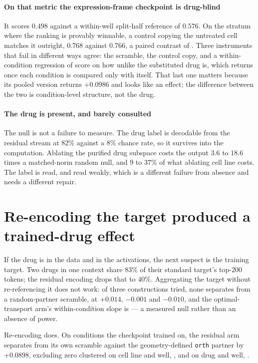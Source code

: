 \paragraph{On that metric the expression-frame checkpoint is drug-blind} It
scores $0.498$ against a within-well split-half reference of $0.576$. On the
stratum where the ranking is provably winnable, a control copying the untreated
cell matches it outright, $0.768$ against $0.766$, a paired contrast of
. Three instruments that fail in different ways agree:
the scramble, the control copy, and a within-condition regression of score on how
unlike the substituted drug is, which returns  once
each condition is compared only with itself. That last one matters because its
pooled version returns $+0.0986$ and looks like an effect; the difference between
the two is condition-level structure, not the drug.

\paragraph{The drug is present, and barely consulted} The null is not a failure
to measure. The drug label is decodable from the residual stream at $82\%$
against a $8\%$ chance rate, so it survives into the computation. Ablating the
purified drug subspace costs the output $3.6$ to $18.6$ times a matched-norm
random null, and $9$ to $37\%$ of what ablating cell line costs. The label is
read, and read weakly, which is a different failure from absence and needs a
different repair.

\section{Re-encoding the target produced a trained-drug effect}

If the drug is in the data and in the activations, the next suspect is the
training target. Two drugs in one context share $83\%$ of their standard target's
top-$200$ tokens; the residual encoding drops that to $40\%$. Aggregating the
target without re-referencing it does not work: of three constructions tried,
none separates from a random-partner scramble, at $+0.014$, $-0.001$ and
$-0.010$, and the optimal-transport arm's within-condition slope is
 --- a measured null rather than an absence of
power.

Re-encoding does. On conditions the checkpoint trained on, the residual arm
separates from its own scramble against the geometry-defined \texttt{orth}
partner by $+0.0898$, excluding zero clustered on cell line and well,
, and on drug and well,
.

